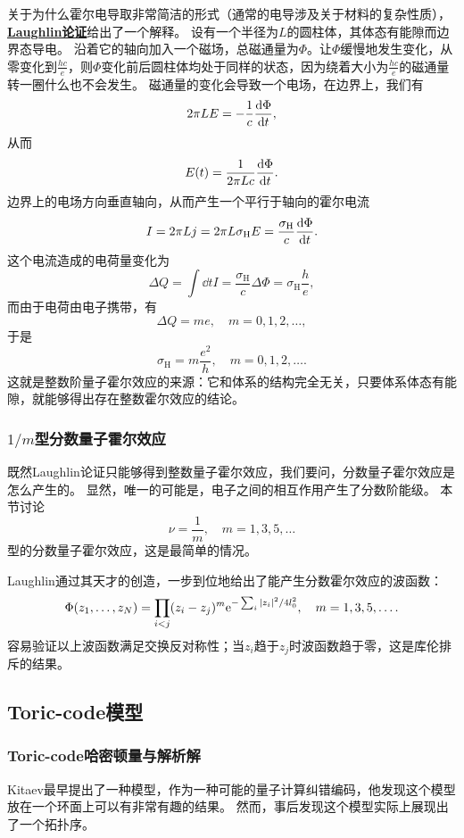 \documentclass[hyperref, UTF8, a4paper]{ctexart}
\newcommand*{\ee}{\mathrm{e}}
\newcommand*{\concept}[1]{\underline{\textbf{#1}}}
\begin{document}
关于为什么霍尔电导取非常简洁的形式（通常的电导涉及关于材料的复杂性质），\concept{Laughlin论证}给出了一个解释。
设有一个半径为$L$的圆柱体，其体态有能隙而边界态导电。
沿着它的轴向加入一个磁场，总磁通量为$\Phi$。让$\Phi$缓慢地发生变化，从零变化到$\frac{h c}{e}$，则$\Phi$变化前后圆柱体均处于同样的状态，因为绕着大小为$\frac{h c}{e}$的磁通量转一圈什么也不会发生。
磁通量的变化会导致一个电场，在边界上，我们有
\[
    2 \pi L E = - \frac{1}{c} \dv{\Phi}{t},
\]
从而
\[
    E(t) = \frac{1}{2\pi L c} \dv{\Phi}{t}.
\]
边界上的电场方向垂直轴向，从而产生一个平行于轴向的霍尔电流
\[
    I = 2 \pi L j = 2 \pi L \sigma_\text{H} E = \frac{\sigma_\text{H}}{c} \dv{\Phi}{t}.
\]
这个电流造成的电荷量变化为
\[
    \Delta Q = \int \dd{t} I = \frac{\sigma_\text{H}}{c} \Delta \Phi = \sigma_\text{H} \frac{h}{e},
\]
而由于电荷由电子携带，有
\[
    \Delta Q = me, \quad m = 0, 1, 2, \ldots,
\]
于是
\[
    \sigma_\text{H} = m \frac{e^2}{h}, \quad m = 0, 1, 2, \ldots.
\]
这就是整数阶量子霍尔效应的来源：它和体系的结构完全无关，只要体系体态有能隙，就能够得出存在整数霍尔效应的结论。

\subsubsection{$1/m$型分数量子霍尔效应}

既然Laughlin论证只能够得到整数量子霍尔效应，我们要问，分数量子霍尔效应是怎么产生的。
显然，唯一的可能是，电子之间的相互作用产生了分数阶能级。
本节讨论
\[
    \nu = \frac{1}{m}, \quad m = 1, 3, 5, \ldots
\]
型的分数量子霍尔效应，这是最简单的情况。

Laughlin通过其天才的创造，一步到位地给出了能产生分数霍尔效应的波函数：
\begin{equation}
    \Phi(z_1, \ldots, z_N) = \prod_{i < j} (z_i - z_j)^{m} \ee^{- \sum_i \abs*{z_i}^2 / 4 l_0^2}, \quad m = 1, 3, 5, \ldots.
\end{equation}
容易验证以上波函数满足交换反对称性；当$z_i$趋于$z_j$时波函数趋于零，这是库伦排斥的结果。

\subsection{Toric-code模型}

\subsubsection{Toric-code哈密顿量与解析解}

Kitaev最早提出了一种模型，作为一种可能的量子计算纠错编码，他发现这个模型放在一个环面上可以有非常有趣的结果。
然而，事后发现这个模型实际上展现出了一个拓扑序。
\end{document}
